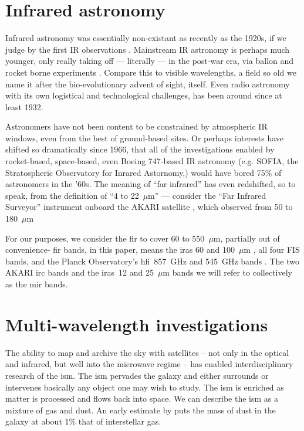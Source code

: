   \section{Infrared astronomy}

    Infrared astronomy was essentially non-existant as recently as the 1920s, if we judge by the first IR observations \citep{pettit22, pettit28}. Mainstream IR astronomy is perhaps much younger, only really taking off --- literally --- in the post-war era, via ballon and rocket borne experiments \citep{johnson66}. Compare this to visible wavelengths, a field so old we name it after the bio-evolutionary advent of sight, itself. Even radio astronomy with its own logistical and technological challenges, has been around since at least 1932.

    Astronomers have not been content to be constrained by atmospheric IR windows, even from the best of ground-based sites. Or perhaps interests have shifted so dramatically since 1966, that all of the investigations enabled by rocket-based, space-based, even Boeing 747-based IR astronomy (e.g. SOFIA, the Stratospheric Observatory for Inrared Astornomy,\cite{young12}) would have bored 75\% of astronomers in the '60s. The meaning of ``far infrared'' has even redshifted, so to speak, from the \cite{johnson66} definition of ``4 to 22~$\mu$m'' --- consider the ``Far Infrared Surveyor'' instrument onboard the AKARI satellite \citep{akari07}, which observed from 50 to 180~$\mu$m \citep{kawada07}

     For our purposes, we consider the \gls{fir} to cover 60 to 550~$\mu$m, partially out of convenience- \gls{fir} bands, in this paper, means the \gls{iras} 60 and 100~$\mu$m \citep{iras84}, all four FIS bands, and the Planck Observatory's \gls{hfi}~857~GHz and 545~GHz bands \citep{planckEarly11I, hfi14viii}. The two AKARI \gls{irc} \citep{irc07,ishihara10} bands and the \gls{iras}~12 and 25~$\mu$m bands we will refer to collectively as the \gls{mir} bands.

 \section{Multi-wavelength investigations}

     The ability to map and archive the sky with satellites -- not only in the optical and infrared, but well into the microwave regime -- has enabled interdisciplinary research of the \gls{ism}. The \gls{ism} pervades the galaxy and either surrounds or intervenes basically any object one may wish to study. The \gls{ism} is enriched as matter is processed and flows back into space. We can describe the \gls{ism} as a mixture of gas and dust. An early estimate by \cite{knapp74} puts the mass of dust in the galaxy at about 1\% that of interstellar gas.

